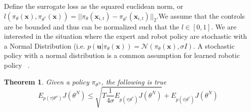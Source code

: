 \documentclass[10pt, conference]{ieeeconf}      %
\newtheorem{theorem}{Theorem}[section]
\newcommand{\bu}{\mathbf{u}}
\newcommand{\bx}{\mathbf{x}}
\begin{document}
 Define the surrogate loss as the squared euclidean norm, or $l(\pi_{\theta}(\bx),\pi_{\theta^*}(\bx)) = ||\pi_{\theta}(\bx_{i,t}) - \pi_{\theta^*}(\bx_{i,t})||_2$.We assume that the controls are be bounded and thus can be normalized such that the $l \in [0,1]$.  We are interested in the situation where the expert and robot policy are stochastic with a Normal Distribution (i.e. $p(\bu|\pi_{\theta}(\bx)) = \mathcal{N}(\pi_\theta(\bx),\sigma I)$. A stochastic policy with a normal distribution is a common assumption for learned robotic policy ~\cite{levine2015end}. 
 

\begin{theorem}
Given a policy $\pi_{\theta^N}$, the following is true 
$$E_{p(\tau|\theta^n)} J(\theta^N) \leq \sqrt{T\frac{1}{4\sigma}E_{p(\tau|\theta^*)} J(\theta^N)}+E_{p(\tau|\theta^*)} J(\theta^N)$$\\
\end{theorem}
\end{document}
